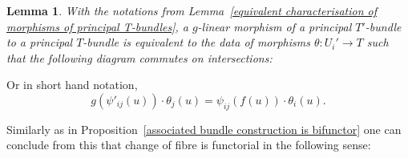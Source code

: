 \documentclass[10pt,oneside]{amsart}
\newtheorem{lemma}[theorem]{Lemma}
\theoremstyle{definition}
\theoremstyle{remark}
\begin{document}
	\begin{lemma}
		With the notations from Lemma~\ref{equivalent characterisation of morphisms of principal T-bundles}, a $g$-linear morphism of a principal $T'$-bundle to a principal $T$-bundle is equivalent to the data of morphisms $\theta: U_i'\rightarrow T$ such that the following diagram commutes on intersections:
		\begin{center}
		\end{center}
	\end{lemma}
	Or in short hand notation,
	\begin{equation}\label{shorthand for description of semi-linear morphism of fibre  bundles}
	g(\psi'_{ij}(u))\cdot\theta_j(u)=\psi_{ij}(f(u))\cdot \theta_i(u).
	\end{equation}
	
	
	Similarly as in Proposition~\ref{associated bundle construction is bifunctor} one can conclude from this that change of fibre is functorial in the following sense:
	
\end{document}
